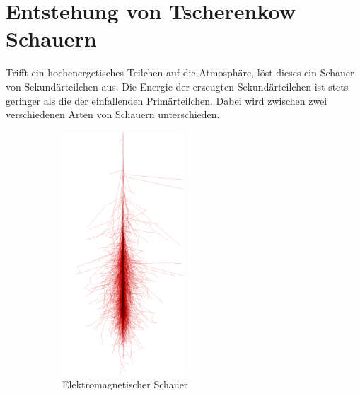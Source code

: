 \chapter{Entstehung von Tscherenkow Schauern}
\label{sec:cherenkov}
Trifft ein hochenergetisches Teilchen auf die Atmosphäre, löst dieses ein Schauer von Sekundärteilchen aus. 
Die Energie der erzeugten Sekundärteilchen ist stets geringer als die der einfallenden Primärteilchen. 
Dabei wird zwischen zwei verschiedenen Arten von Schauern unterschieden. 
\begin{figure}[H]
  \centering
  \begin{subfigure}[t]{0.49\textwidth}
  	\centering
	\includegraphics[width=0.5\textwidth]{images/photon_100GeV.png}
	\caption{Elektromagnetischer Schauer}
  \end{subfigure}
  \begin{subfigure}[t]{0.49\textwidth}
  	\centering

\end{subfigure}
\end{figure}
